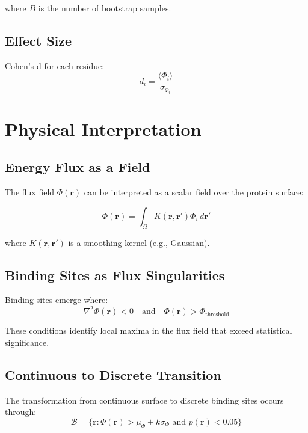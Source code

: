 \documentclass{article}
\begin{document}
where $B$ is the number of bootstrap samples.

\subsection{Effect Size}

Cohen's d for each residue:
\begin{equation}
d_i = \frac{\langle\Phi_i\rangle}{\sigma_{\Phi_i}}
\end{equation}

\section{Physical Interpretation}

\subsection{Energy Flux as a Field}

The flux field $\Phi(\mathbf{r})$ can be interpreted as a scalar field over the protein surface:

\begin{equation}
\Phi(\mathbf{r}) = \int_{\Omega} K(\mathbf{r}, \mathbf{r'}) \Phi_i \, d\mathbf{r'}
\end{equation}

where $K(\mathbf{r}, \mathbf{r'})$ is a smoothing kernel (e.g., Gaussian).

\subsection{Binding Sites as Flux Singularities}

Binding sites emerge where:
\begin{equation}
\nabla^2 \Phi(\mathbf{r}) < 0 \quad \text{and} \quad \Phi(\mathbf{r}) > \Phi_{\text{threshold}}
\end{equation}

These conditions identify local maxima in the flux field that exceed statistical significance.

\subsection{Continuous to Discrete Transition}

The transformation from continuous surface to discrete binding sites occurs through:
\begin{equation}
\mathcal{B} = \{\mathbf{r} : \Phi(\mathbf{r}) > \mu_\Phi + k\sigma_\Phi \text{ and } p(\mathbf{r}) < 0.05\}
\end{equation}
\end{document}
